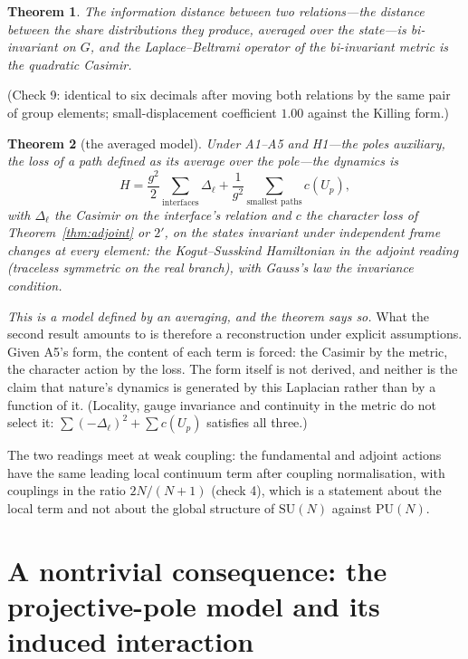 \documentclass[11pt,a4paper]{article}
\theoremstyle{plain}
\newtheorem{theorem}{Theorem}
\theoremstyle{definition}
\theoremstyle{remark}
\newcommand{\SU}{\mathrm{SU}}
\newcommand{\PU}{\mathrm{PU}}
\begin{document}
\begin{theorem}\label{thm:casimir}
The information distance between two relations---the distance between the share distributions they produce, averaged over the state---is bi-invariant on $G$, and the Laplace--Beltrami operator of the bi-invariant metric is the quadratic Casimir.
\end{theorem}
(Check 9: identical to six decimals after moving both relations by the same pair of group elements; small-displacement coefficient $1.00$ against the Killing form.)

\begin{theorem}[the averaged model]\label{thm:averaged}
Under A1--A5 and H1---the poles auxiliary, the loss of a path \emph{defined} as its average over the pole---the dynamics is
\begin{equation}
H=\frac{g^2}{2}\sum_{\text{interfaces}}\Delta_\ell+\frac{1}{g^2}\sum_{\text{smallest paths}}c(U_p),
\end{equation}
with $\Delta_\ell$ the Casimir on the interface's relation and $c$ the character loss of Theorem~\ref{thm:adjoint} or $2'$, on the states invariant under independent frame changes at every element: the Kogut--Susskind Hamiltonian \cite{ks} in the adjoint reading (traceless symmetric on the real branch), with Gauss's law the invariance condition.
\end{theorem}
\emph{This is a model defined by an averaging, and the theorem says so.} What the second result amounts to is therefore a reconstruction under explicit assumptions. Given A5's form, the content of each term is forced: the Casimir by the metric, the character action by the loss. The form itself is not derived, and neither is the claim that nature's dynamics is generated by this Laplacian rather than by a function of it. (Locality, gauge invariance and continuity in the metric do not select it: $\sum(-\Delta_\ell)^2+\sum c(U_p)$ satisfies all three.)

The two readings meet at weak coupling: the fundamental and adjoint actions have the same leading local continuum term after coupling normalisation, with couplings in the ratio $2N/(N+1)$ (check 4), which is a statement about the local term and not about the global structure of $\SU(N)$ against $\PU(N)$.

\section{A nontrivial consequence: the projective-pole model and its induced interaction}\label{sec:consequence}
\end{document}
